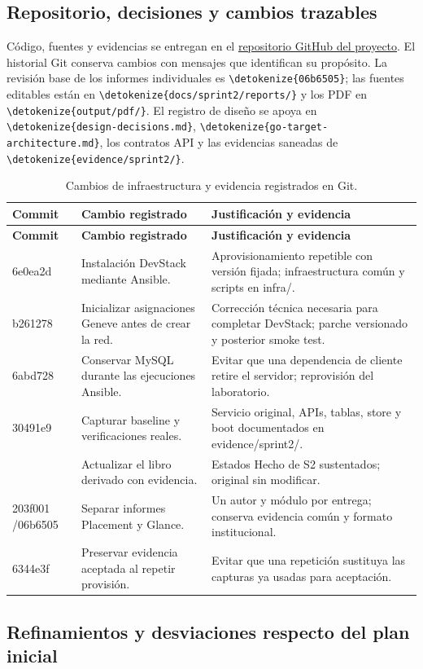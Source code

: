 \documentclass[12pt,a4paper]{article}
\newcommand{\code}[1]{{\small\expandafter\nolinkurl\expandafter{\detokenize{#1}}}}
\newcommand{\reporttable}[4]{\begingroup\small\setlength{\LTpre}{8pt}\setlength{\LTpost}{8pt}\setlength{\tabcolsep}{4pt}\renewcommand{\arraystretch}{1.15}
\begin{longtable}{#2}\caption{#1}\\\toprule #3\\\midrule\endfirsthead
\toprule #3\\\midrule\endhead\bottomrule\endfoot #4\end{longtable}\endgroup}
\begin{document}
\subsection{Repositorio, decisiones y cambios trazables}
Código, fuentes y evidencias se entregan en el \href{https://github.com/PaoloCastanon/modules-devstack-optimized}{repositorio GitHub del proyecto}. El historial Git conserva cambios con mensajes que identifican su propósito. La revisión base de los informes individuales es \code{06b6505}; las fuentes editables están en \code{docs/sprint2/reports/} y los PDF en \code{output/pdf/}. El registro de diseño se apoya en \code{design-decisions.md}, \code{go-target-architecture.md}, los contratos API y las evidencias saneadas de \code{evidence/sprint2/}.


\reporttable{Cambios de infraestructura y evidencia registrados en Git.}{>{\raggedright\arraybackslash}p{1.8cm}>{\raggedright\arraybackslash}p{5.5cm}>{\raggedright\arraybackslash}p{7.4cm}}{\textbf{Commit}&\textbf{Cambio registrado}&\textbf{Justificación y evidencia}}{
6e0ea2d&Instalación DevStack mediante Ansible.&Aprovisionamiento repetible con versión fijada; infraestructura común y scripts en infra/.\\*
b261278&Inicializar asignaciones Geneve antes de crear la red.&Corrección técnica necesaria para completar DevStack; parche versionado y posterior smoke test.\\*
6abd728&Conservar MySQL durante las ejecuciones Ansible.&Evitar que una dependencia de cliente retire el servidor; reprovisión del laboratorio.\\*
30491e9&Capturar baseline y verificaciones reales.&Servicio original, APIs, tablas, store y boot documentados en evidence/sprint2/.\\*
5052749&Actualizar el libro derivado con evidencia.&Estados Hecho de S2 sustentados; original sin modificar.\\*
203f001 /\newline 06b6505&Separar informes Placement y Glance.&Un autor y módulo por entrega; conserva evidencia común y formato institucional.\\*
6344e3f&Preservar evidencia aceptada al repetir provisión.&Evitar que una repetición sustituya las capturas ya usadas para aceptación.\\}


\Needspace{415pt}
\subsection{Refinamientos y desviaciones respecto del plan inicial}
\end{document}
